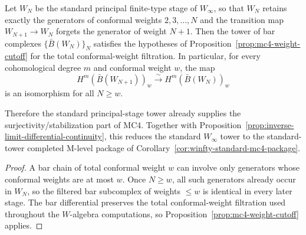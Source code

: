 \begin{corollary}
\label{cor:winfty-weight-cutoff}
Let $W_N$ be the standard principal finite-type stage of $W_\infty$,
so that $W_N$ retains exactly the generators of conformal weights
$2,3,\dots,N$ and the transition map $W_{N+1}\to W_N$ forgets the
generator of weight $N+1$. Then the tower of bar complexes
$\{\bar B(W_N)\}_N$ satisfies the hypotheses of
Proposition~\ref{prop:mc4-weight-cutoff} for the total conformal-weight
filtration. In particular, for every cohomological degree $m$ and
conformal weight $w$, the map
\[
H^m(\bar B(W_{N+1}))_w \xrightarrow{\sim} H^m(\bar B(W_N))_w
\]
is an isomorphism for all $N \ge w$.

Therefore the standard principal-stage tower already supplies the
surjectivity/stabilization part of MC4. Together with
Proposition~\ref{prop:inverse-limit-differential-continuity}, this
reduces the standard $W_\infty$ tower to the standard-tower completed
M-level package of Corollary~\ref{cor:winfty-standard-mc4-package}.
\end{corollary}

\begin{proof}
A bar chain of total conformal weight $w$ can involve only generators
whose conformal weights are at most $w$. Once $N \ge w$, all such
generators already occur in $W_N$, so the filtered bar subcomplex of
weights $\le w$ is identical in every later stage. The bar
differential preserves the total conformal-weight filtration used
throughout the \(W\)-algebra computations, so
Proposition~\ref{prop:mc4-weight-cutoff} applies.
\end{proof}

